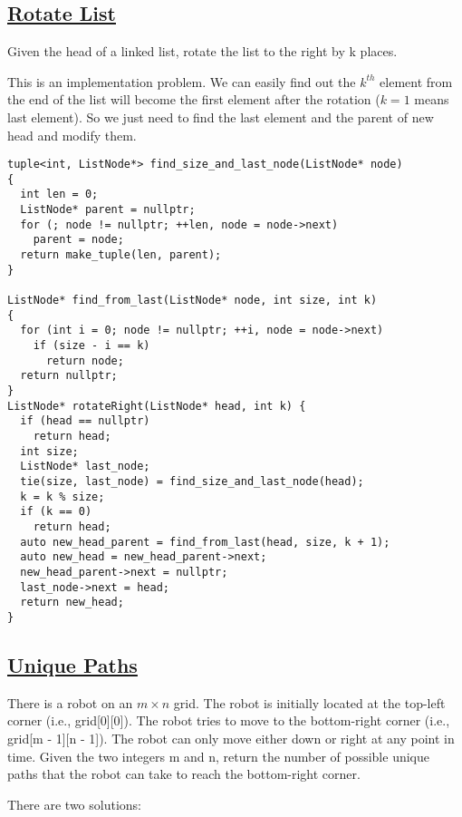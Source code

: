 \documentclass{book}
\begin{document}
	\subsection{\href{https://leetcode.com/problems/rotate-list/}{Rotate List}}
	Given the head of a linked list, rotate the list to the right by k places.
	\par This is an implementation problem. We can easily find out the $k^{th}$ element from the end of the list will become the first element after the rotation ($k = 1$ means last element). So we just need to find the last element and the parent of new head and modify them.
	\begin{lstlisting}
tuple<int, ListNode*> find_size_and_last_node(ListNode* node)
{
  int len = 0;
  ListNode* parent = nullptr;
  for (; node != nullptr; ++len, node = node->next)
    parent = node;
  return make_tuple(len, parent);
}

ListNode* find_from_last(ListNode* node, int size, int k)
{
  for (int i = 0; node != nullptr; ++i, node = node->next)
    if (size - i == k)
      return node;
  return nullptr;
}
ListNode* rotateRight(ListNode* head, int k) {
  if (head == nullptr)
    return head;
  int size;
  ListNode* last_node;
  tie(size, last_node) = find_size_and_last_node(head);
  k = k % size;
  if (k == 0)
    return head;
  auto new_head_parent = find_from_last(head, size, k + 1);
  auto new_head = new_head_parent->next;
  new_head_parent->next = nullptr;
  last_node->next = head;
  return new_head;
}
	\end{lstlisting}
	\subsection{\href{https://leetcode.com/problems/unique-paths/}{Unique Paths}}
	There is a robot on an $m \times n$ grid. The robot is initially located at the top-left corner (i.e., grid[0][0]). The robot tries to move to the bottom-right corner (i.e., grid[m - 1][n - 1]). The robot can only move either down or right at any point in time. Given the two integers m and n, return the number of possible unique paths that the robot can take to reach the bottom-right corner.
	\par There are two solutions:
\end{document}
